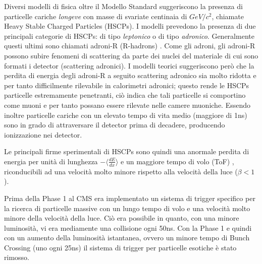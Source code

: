 Diversi modelli di fisica oltre il Modello Standard suggeriscono la presenza di particelle cariche \textit{longeve} con masse di svariate centinaia di $GeV/c^2$, chiamate Heavy Stable Charged Particles (HSCPs). I modelli prevedono la presenza di due principali categorie di HSCPs: di tipo \textit{leptonico} o di tipo \textit{adronico}. Generalmente questi ultimi sono chiamati adroni-R (R-hadrons) \cite{Quertenmont:2010ota}. \newline
Come gli adroni, gli adroni-R possono subire fenomeni di scattering da parte dei nuclei del materiale di cui sono formati i detector (scattering adronici). I modelli teorici suggeriscono però che la perdita di energia degli adroni-R a seguito scattering adronico sia molto ridotta e per tanto difficilmente rilevabile in calorimetri adronici; questo rende le HSCPs particelle estremamente penetranti, ciò indica che tali particelle si comportino come muoni e per tanto possano essere rilevate nelle camere muoniche. \newline
Essendo inoltre particelle cariche con un elevato tempo di vita medio (maggiore di 1ns) sono in grado di attraversare il detector prima di decadere, producendo ionizzazione nei detector.

Le principali firme sperimentali di HSCPs sono quindi una anormale perdita di energia per unità di lunghezza $- \langle \frac{dE}{dx}\rangle$ e un maggiore tempo di volo (ToF) \cite{MasterThesisGioMoc}, riconducibili ad una velocità molto minore rispetto alla velocità della luce ($\beta < 1$). 

Prima della Phase 1 al CMS era implementato un sistema di trigger specifico per la ricerca di particelle massive con un lungo tempo di volo e una velocità molto minore della velocità della luce. Ciò era possibile in quanto, con una minore luminosità, vi era mediamente una collisione ogni 50ns. Con la Phase 1 e quindi con un aumento della luminosità istantanea, ovvero un minore tempo di Bunch Crossing (uno ogni 25ns) il sistema di trigger per particelle esotiche è stato rimosso. 





